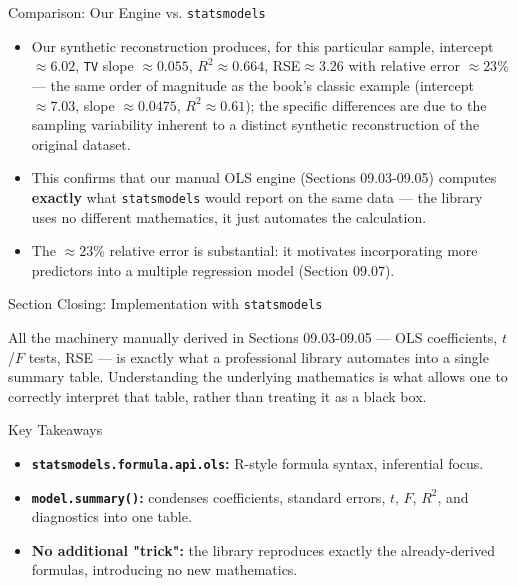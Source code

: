 \documentclass[10pt, aspectratio=169]{beamer}
\begin{document}
\begin{frame}{Comparison: Our Engine vs. \texttt{statsmodels}}
  \footnotesize
  \begin{itemize}\itemsep=0.12cm
    \item Our synthetic reconstruction produces, for this particular sample, intercept $\approx6.02$, \texttt{TV} slope $\approx0.055$, $R^2\approx0.664$, RSE$\approx3.26$ with relative error $\approx23\%$ --- the same order of magnitude as the book's classic example (intercept $\approx7.03$, slope $\approx0.0475$, $R^2\approx0.61$); the specific differences are due to the sampling variability inherent to a distinct synthetic reconstruction of the original dataset. \pause
    \item This confirms that our manual OLS engine (Sections 09.03-09.05) computes \textbf{exactly} what \texttt{statsmodels} would report on the same data --- the library uses no different mathematics, it just automates the calculation. \pause
    \item The $\approx23\%$ relative error is substantial: it motivates incorporating more predictors into a multiple regression model (Section 09.07).
  \end{itemize}
\end{frame}

\begin{frame}{Section Closing: Implementation with \texttt{statsmodels}}
  \begin{reflexion}
    All the machinery manually derived in Sections 09.03-09.05 --- OLS coefficients, $t$/$F$ tests, RSE --- is exactly what a professional library automates into a single summary table. Understanding the underlying mathematics is what allows one to correctly interpret that table, rather than treating it as a black box.
  \end{reflexion}

  \vspace{0.2cm}
  \pause
  \begin{block}{Key Takeaways}
    \begin{itemize}\itemsep=0.08cm
      \item \textbf{\texttt{statsmodels.formula.api.ols}:} R-style formula syntax, inferential focus.
      \item \textbf{\texttt{model.summary()}:} condenses coefficients, standard errors, $t$, $F$, $R^2$, and diagnostics into one table.
      \item \textbf{No additional "trick":} the library reproduces exactly the already-derived formulas, introducing no new mathematics.
    \end{itemize}
  \end{block}
\end{frame}
\end{document}
